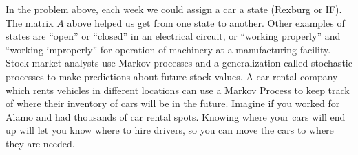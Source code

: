\documentclass[letterpaper,oneside]{book}%
\theoremstyle{plain}
\theoremstyle{box}
\theoremstyle{problem}
\begin{document}
In the problem above, each week we could assign a car a state (Rexburg or IF).  The matrix $A$ above helped us get from one state to another.  Other examples of states are ``open'' or ``closed'' in an electrical circuit, or ``working properly'' and ``working improperly'' for operation of machinery at a manufacturing facility.  Stock market analysts use Markov processes and a generalization called stochastic processes to make predictions about future stock values. A car rental company which rents vehicles in different locations can use a Markov Process to keep track of where their inventory of cars will be in the future.  Imagine if you worked for Alamo and had thousands of car rental spots. Knowing where your cars will end up will let you know where to hire drivers, so you can move the cars to where they are needed. 
\end{document}
